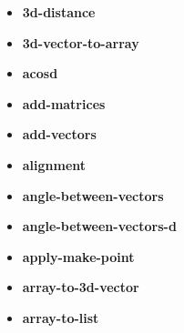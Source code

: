 \documentclass [11pt]{book}
\begin{document}
\begin{itemize}

\item {}
\label{prim:3d-distance}
\textbf{3d-distance}





\item {}
\label{prim:3d-vector-to-array}
\textbf{3d-vector-to-array}





\item {}
\label{prim:acosd}
\textbf{acosd}





\item {}
\label{prim:add-matrices}
\textbf{add-matrices}





\item {}
\label{prim:add-vectors}
\textbf{add-vectors}





\item {}
\label{prim:alignment}
\textbf{alignment}





\item {}
\label{prim:angle-between-vectors}
\textbf{angle-between-vectors}





\item {}
\label{prim:angle-between-vectors-d}
\textbf{angle-between-vectors-d}





\item {}
\label{prim:apply-make-point}
\textbf{apply-make-point}





\item {}
\label{prim:array-to-3d-vector}
\textbf{array-to-3d-vector}





\item {}
\label{prim:array-to-list}
\textbf{array-to-list}






\end{itemize}
\end{document}

